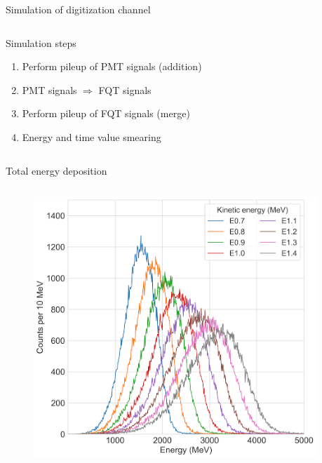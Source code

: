 \documentclass[compress, 13pt, aspectratio=169]{beamer}
\begin{document}
\begin{frame}{Simulation of digitization channel}
\begin{columns}
\begin{column}{0.5\textwidth}
\begin{block}{Simulation steps}
\begin{enumerate}
                    \item<3-> Perform pileup of PMT signals (addition)
                    \item<3-> PMT signals $\Rightarrow$ FQT signals
                    \item<4-> Perform pileup of FQT signals (merge)
                    \item<4-> Energy and time value smearing
                \end{enumerate}
            \end{block}
        \end{column}
    \end{columns}
\end{frame}

\begin{frame}{Total energy deposition}
    \vspace*{-0.7cm}
    \begin{columns}
        \begin{column}{0.5\textwidth}
            \begin{figure}[t]
                \includegraphics[keepaspectratio, width = \textwidth]{Plots/ETot_4n}%
            \end{figure}
        \end{column}
        \begin{column}{0.5\textwidth}

\end{column}
\end{columns}
\end{frame}
\end{document}
